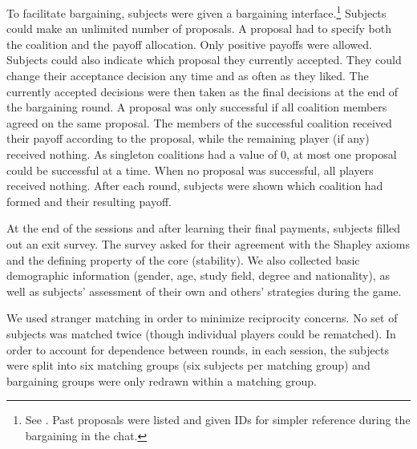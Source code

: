 To facilitate bargaining, subjects were given a bargaining interface.\footnote{See . Past proposals were listed and given IDs for simpler reference during the bargaining in the chat.} Subjects could make an unlimited number of proposals. A proposal had to specify both the coalition and the payoff allocation. Only positive payoffs were allowed. Subjects could also indicate which proposal they currently accepted. They could change their acceptance decision any time and as often as they liked. The currently accepted decisions were then taken as the final decisions at the end of the bargaining round. A proposal was only successful if all coalition members agreed on the same proposal. The members of the successful coalition received their payoff according to the proposal, while the remaining player (if any) received nothing. As singleton coalitions had a value of 0, at most one proposal could be successful at a time. When no proposal was successful, all players received nothing. After each round, subjects were shown which coalition had formed and their resulting payoff.

At the end of the sessions and after learning their final payments, subjects filled out an exit survey. The survey asked for their agreement with the Shapley axioms and the defining property of the core (stability). We also collected basic demographic information (gender, age, study field, degree and nationality), as well as subjects' assessment of their own and others' strategies during the game.


We used stranger matching in order to minimize reciprocity concerns. No set of subjects was matched twice (though individual players could be rematched). In order to account for dependence between rounds, in each session, the subjects were split into six matching groups (six subjects per matching group) and bargaining groups were only redrawn within a matching group. 

